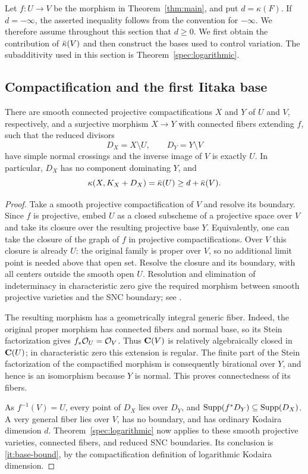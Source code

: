 Let $f:U\to V$ be the morphism in Theorem~\ref{thm:main}, and put
$d=\kappa(F)$.  If $d=-\infty$, the asserted inequality follows from the
convention for $-\infty$.  We therefore assume throughout this section that
$d\geq 0$.  We first obtain the contribution of $\bar\kappa(V)$ and then construct
the bases used to control variation.  The subadditivity used in this section is
Theorem~\ref{spec:logarithmic}.

\subsection{Compactification and the first Iitaka base}

\begin{lemma}\label{it:compactification}
There are smooth connected projective compactifications $X$ and $Y$ of $U$
and $V$, respectively, and a surjective morphism $X\to Y$ with connected
fibers extending $f$, such that the reduced divisors
\[
 D_X=X\setminus U,\qquad D_Y=Y\setminus V
\]
have simple normal crossings and the inverse image of $V$ is exactly $U$.
In particular, $D_X$ has no component dominating $Y$, and
\begin{equation}\label{it:base-bound}
 \kappa(X,K_X+D_X)=\bar\kappa(U)
 \geq d+\bar\kappa(V).
\end{equation}
\end{lemma}

\begin{proof}
Take a smooth projective compactification of $V$ and resolve its boundary.
Since $f$ is projective, embed $U$ as a closed subscheme of a projective
space over $V$ and take its closure over the resulting projective base $Y$.
Equivalently, one can take the closure of the graph of $f$ in projective
compactifications.  Over $V$ this closure is already $U$: the original
family is proper over $V$, so no additional limit point is needed above
that open set.  Resolve the closure and its boundary, with all centers
outside the smooth open $U$.  Resolution and elimination of indeterminacy
in characteristic zero give the required morphism between smooth projective
varieties and the SNC boundary; see \cite{BierstoneMilmanFunctorial}.

The resulting morphism has a geometrically integral generic fiber.  Indeed,
the original proper morphism has connected fibers and normal base, so its
Stein factorization gives $f_*\mathcal O_U=\mathcal O_V$.  Thus $\mathbf C(V)$ is relatively
algebraically closed in $\mathbf C(U)$; in characteristic zero this extension is
regular.  The finite part of the Stein factorization of the compactified
morphism is consequently birational over $Y$, and hence is an isomorphism
because $Y$ is normal.  This proves connectedness of its fibers.

As $f^{-1}(V)=U$, every point of $D_X$ lies over $D_Y$, and
$\operatorname{Supp}(f^*D_Y)\subseteq\operatorname{Supp}(D_X)$.  A very general fiber lies over $V$,
has no boundary, and has ordinary Kodaira dimension $d$.
Theorem~\ref{spec:logarithmic} now applies to these smooth projective varieties,
connected fibers, and reduced SNC boundaries.  Its conclusion is
\eqref{it:base-bound}, by the compactification definition of logarithmic
Kodaira dimension.
\end{proof}

